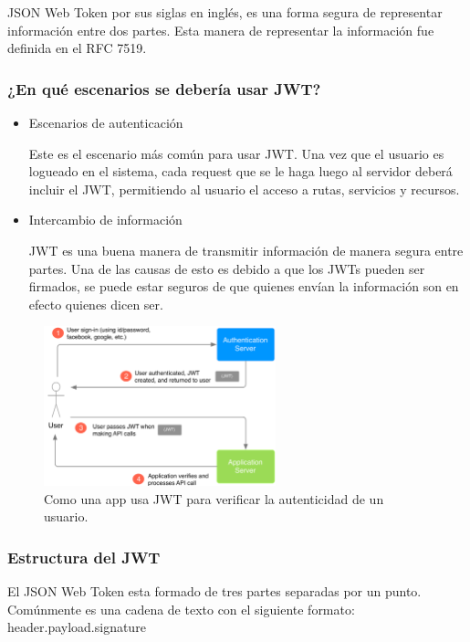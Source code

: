 JSON Web Token por sus siglas en inglés, es una forma segura de representar información 
entre dos partes. Esta manera de representar la información fue definida en el RFC 7519.

\subsubsection{¿En qué escenarios se debería usar JWT?}
\begin{itemize}
	\item Escenarios de autenticación
	
	Este es el escenario más común para usar JWT. Una vez que el usuario es logueado en el 
	sistema, cada request que se le haga luego al servidor deberá incluir el JWT, 
	permitiendo al usuario el acceso a rutas, servicios y recursos. 
	
	\item Intercambio de información
	
	JWT es una buena manera de transmitir información de manera segura entre partes. Una 
	de las causas de esto es debido a que los JWTs pueden ser firmados, se puede estar 
	seguros de que quienes envían la información son en efecto quienes dicen ser. 
\end{itemize}

\begin{figure}[htbp!] 
\centering    
\includegraphics[width=0.6\textwidth]{jwt1}
\caption[JWT]{Como una app usa JWT para verificar la autenticidad de un usuario.}
\label{fig:jwt-auth-user}
\end{figure}

\subsubsection{Estructura del JWT}
El JSON Web Token esta formado de tres partes separadas por un punto. Comúnmente es una 
cadena de texto con el siguiente formato: header.payload.signature

